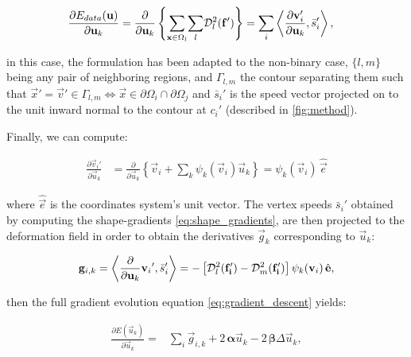   \begin{align}
  \frac{\partial E_{data}(\vec{u})}{\partial \vec{u}_k} &=
  \frac{ \partial }{\partial \vec{u}_k} \left\{
   \underset{\vec{x} \in \Omega_l}{\sum} \underset{l}{\sum} \mdist{f'}{l} \right\}
  = \underset{i}{\sum}
   \left\langle \frac{\partial \vec{v}_i'}{\partial \vec{u}_k}, \bar{s}_i'\right\rangle,
  \label{eq:gradient_wshape}
  \end{align}

  in this case, the formulation has been adapted to the non-binary case, $\{l,m\}$
    being any pair of neighboring regions, and $\Gamma_{l,m}$ the contour separating
    them such that
    $\vec{x}' = \vec{v}' \in\Gamma_{l,m} \iff \vec{x}\in \partial\Omega_i \cap \partial\Omega_j$
    and $\bar{s}_i'$ is the speed vector projected on to the unit inward normal to the contour
    at $c_i'$ (described in \autoref{fig:method}).


Finally, we can compute:

  \begin{align}
  \frac{\partial \vec{v}_i'}{\partial \vec{u}_k} &= \frac{\partial}{\partial \vec{u}_k}
  \left\{ \vec{v}_i + \sum_k \psi_k(\vec{v}_i) \vec{u}_k \right\}
  = \psi_k(\vec{v}_i)\, \hat{\vec{e}}
  \label{eq:basis_derivative}
  \end{align}

  where $\hat{\vec{e}}$ is the coordinates system's unit vector.
The vertex speeds $\bar{s}_i'$ obtained by computing the shape-gradients \eqref{eq:shape_gradients},
	are then projected to the deformation field in order to obtain the derivatives $\vec{g}_k$
	corresponding to $\vec{u}_k$:

  \begin{equation}
  \vec{g}_{i,k} = \left\langle \frac{\partial}{\partial \vec{u}_k}{\vec{v}_i}', \bar{s}_i'\right\rangle
  = - \left[ \mdist{f_i'}{l} - \mdist{f_i'}{m} \right] \psi_k(\vec{v}_i)\, \hat{\vec{e}},
  \end{equation}

  then the full gradient evolution equation \eqref{eq:gradient_descent} yields:

  \begin{align}
  \frac{\partial E(\vec{u}_k)}{\partial \vec{u}_k} =
  &\underset{i}{\sum} \vec{g}_{i,k} +2\, \boldsymbol{\alpha} \vec{u}_k
  -2\, \boldsymbol{\beta} \Delta \vec{u}_k,
  \label{eq:gradient_final}
  \end{align}

